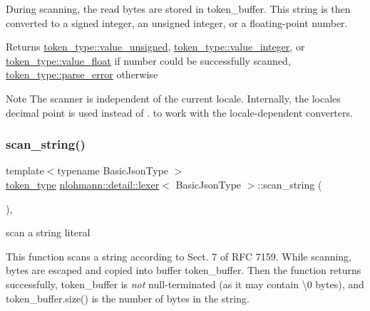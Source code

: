 During scanning, the read bytes are stored in token\+\_\+buffer. This string is then converted to a signed integer, an unsigned integer, or a floating-\/point number.

\begin{DoxyReturn}{Returns}
\hyperlink{classnlohmann_1_1detail_1_1lexer_a3f313cdbe187cababfc5e06f0b69b098aaf1f040fcd2f674d2e5893d7a731078f}{token\+\_\+type\+::value\+\_\+unsigned}, \hyperlink{classnlohmann_1_1detail_1_1lexer_a3f313cdbe187cababfc5e06f0b69b098a5064b6655d88a50ae16665cf7751c0ee}{token\+\_\+type\+::value\+\_\+integer}, or \hyperlink{classnlohmann_1_1detail_1_1lexer_a3f313cdbe187cababfc5e06f0b69b098a0d2671a6f81efb91e77f6ac3bdb11443}{token\+\_\+type\+::value\+\_\+float} if number could be successfully scanned, \hyperlink{classnlohmann_1_1detail_1_1lexer_a3f313cdbe187cababfc5e06f0b69b098a456e19aeafa334241c7ff3f589547f9d}{token\+\_\+type\+::parse\+\_\+error} otherwise
\end{DoxyReturn}
\begin{DoxyNote}{Note}
The scanner is independent of the current locale. Internally, the locale\textquotesingle{}s decimal point is used instead of {\ttfamily .} to work with the locale-\/dependent converters. 
\end{DoxyNote}
\mbox{\label{classnlohmann_1_1detail_1_1lexer_ad271045d1c91df9d6a119482b4aeae7f}} 
\subsubsection{\texorpdfstring{scan\+\_\+string()}{scan\_string()}}
{\footnotesize\ttfamily template$<$typename Basic\+Json\+Type $>$ \\
\hyperlink{classnlohmann_1_1detail_1_1lexer_a3f313cdbe187cababfc5e06f0b69b098}{token\+\_\+type} \hyperlink{classnlohmann_1_1detail_1_1lexer}{nlohmann\+::detail\+::lexer}$<$ Basic\+Json\+Type $>$\+::scan\+\_\+string (\begin{DoxyParamCaption}{ }\end{DoxyParamCaption})\hspace{0.3cm}{\ttfamily [inline]}, {\ttfamily [private]}}



scan a string literal 

This function scans a string according to Sect. 7 of R\+FC 7159. While scanning, bytes are escaped and copied into buffer token\+\_\+buffer. Then the function returns successfully, token\+\_\+buffer is {\itshape not} null-\/terminated (as it may contain \textbackslash{}0 bytes), and token\+\_\+buffer.\+size() is the number of bytes in the string.

